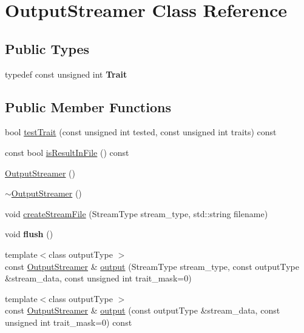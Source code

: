 \hypertarget{class_output_streamer}{\section{Output\-Streamer Class Reference}
\label{class_output_streamer}
}
\subsection*{Public Types}
\begin{DoxyCompactItemize}
\item 
\hypertarget{class_output_streamer_afde0341c035a66313bc0c473545564df}{typedef const unsigned int {\bfseries Trait}}\label{class_output_streamer_afde0341c035a66313bc0c473545564df}

\end{DoxyCompactItemize}
\subsection*{Public Member Functions}
\begin{DoxyCompactItemize}
\item 
bool \hyperlink{class_output_streamer_ac69a0b5740c6789c289f32a847497bcb}{test\-Trait} (const unsigned int tested, const unsigned int traits) const 
\item 
const bool \hyperlink{class_output_streamer_aae4a0d57c45e8c315c782c5ce6974497}{is\-Result\-In\-File} () const 
\item 
\hyperlink{class_output_streamer_a300cf2cf0796ac9f32fa7706dfe6e3f7}{Output\-Streamer} ()
\item 
\hyperlink{class_output_streamer_a2c5b231daa95e75e3d97412bf2825522}{$\sim$\-Output\-Streamer} ()
\item 
void \hyperlink{class_output_streamer_a4f9075e1f4d0990da619fc82e648ed3a}{create\-Stream\-File} (Stream\-Type stream\-\_\-type, std\-::string filename)
\item 
\hypertarget{class_output_streamer_ab5ba0f1791ea756e826b4fa503420915}{void {\bfseries flush} ()}\label{class_output_streamer_ab5ba0f1791ea756e826b4fa503420915}

\item 
{\footnotesize template$<$class output\-Type $>$ }\\const \hyperlink{class_output_streamer}{Output\-Streamer} \& \hyperlink{class_output_streamer_aca59f9ceafef1709da0c99b1d381be0a}{output} (Stream\-Type stream\-\_\-type, const output\-Type \&stream\-\_\-data, const unsigned int trait\-\_\-mask=0)
\item 
{\footnotesize template$<$class output\-Type $>$ }\\const \hyperlink{class_output_streamer}{Output\-Streamer} \& \hyperlink{class_output_streamer_a0b80cd3ff924882963e7f90bb2cdc1f2}{output} (const output\-Type \&stream\-\_\-data, const unsigned int trait\-\_\-mask=0) const 
\end{DoxyCompactItemize}
